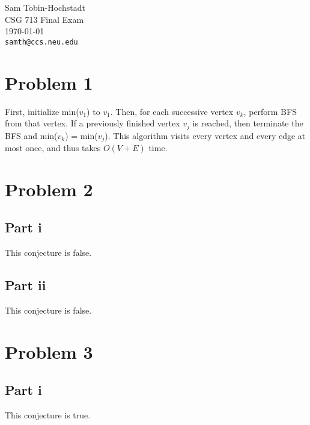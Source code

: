 \documentclass[twoside]{amsart}
\begin{document}
{\raggedleft
Sam Tobin-Hochstadt \\
CSG 713 Final Exam \\
\today \\
{\tt samth@ccs.neu.edu} \\
}


\section*{Problem 1}

First, initialize min($v_1$) to $v_1$.  Then, for each successive
vertex $v_k$, perform BFS from that vertex.  If a previously finished
vertex $v_j$ is reached, then terminate the BFS and min($v_k$) =
min($v_j$). This algorithm visits every vertex and every edge at most
once, and thus takes $O(V + E)$ time.

\section*{Problem 2}

\subsection*{Part i}
This conjecture is false.


\subsection*{Part ii}
This conjecture is false.


\section*{Problem 3}

\subsection*{Part i}

This conjecture is true.
\end{document}
